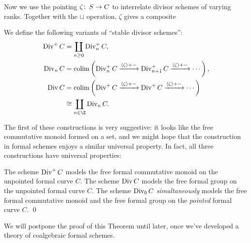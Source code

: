 Now we use the pointing \(\zeta\colon\thinspace S \to C\) to interrelate divisor schemes of varying ranks.  Together with the \(\sqcup\) operation, \(\zeta\) gives a composite
\begin{center}
\end{center}

\begin{definition}\label{StableDivisorSchemeDefn}
We define the following variants of ``stable divisor schemes'':
\begin{align*}
\Div^+ C & = \coprod_{n \ge 0} \Div_n^+ C, \\
\Div_n C & = \colim \left( \Div_n^+ C \xrightarrow{\<\zeta\> + -} \Div_{n+1}^+ C \xrightarrow{\<\zeta\> + -} \cdots \right), \\
\Div C & = \colim \left( \Div^+ C \xrightarrow{\<\zeta\> + -} \Div^+ C \xrightarrow{\<\zeta\> + -} \cdots \right) \\
& \cong \coprod_{n \in \Z} \Div_n C.
\end{align*}
\end{definition}

\noindent The first of these constructions is very suggestive: it looks like the free commutative monoid formed on a set, and we might hope that the construction in formal schemes enjoys a similar universal property.  In fact, all three constructions have universal properties:

\begin{theorem}\label{DivConstructionsAreFree}
The scheme \(\operatorname{Div}^+ C\) models the free formal commutative monoid on the unpointed formal curve \(C\).  The scheme \(\operatorname{Div} C\) models the free formal group on the unpointed formal curve \(C\).  The scheme \(\operatorname{Div}_0 C\) \emph{simultaneously} models the free formal commutative monoid and the free formal group on the \emph{pointed} formal curve \(C\). \qed
\end{theorem}
\noindent We will postpone the proof of this Theorem until later, once we've developed a theory of coalgebraic formal schemes.

